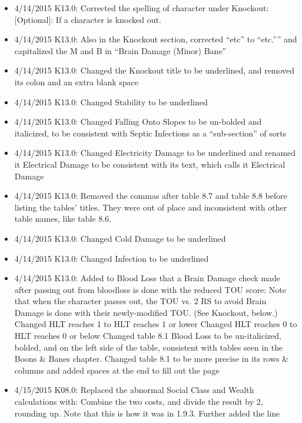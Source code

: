 \documentclass[oneside,11pt,english]{book}
\begin{document}
{\begin{itemize}
Renamed the Head Trauma table to Brain Damage 
Capitalized all instances of “Int” to “INT” under Brain Damage 
Added The result is the effect of the Bane.to the level 2 Brain Damage bane 
 Changed a great amount of the Bane’s wording 
 Altered the Brain Damage table’s results for 4 - 7 
 Wrote an Example for Brain Damage in use 
\item 4/14/2015 K13.0: Corrected the spelling of character under Knockout: [Optional]: If a character is 
knocked out. 
\item 4/14/2015 K13.0: Also in the Knockout section, corrected “etc” to “etc.”” and capitalized the M and B in 
“Brain Damage (Minor) Bane” 
\item 4/14/2015 K13.0: Changed the Knockout title to be underlined, and removed its colon and an extra blank 
space 
\item 4/14/2015 K13.0: Changed Stability to be underlined 
\item 4/14/2015 K13.0: Changed Falling Onto Slopes to be un-bolded and italicized, to be consistent with 
Septic Infections as a “sub-section” of sorts 
\item 4/14/2015 K13.0: Changed Electricity Damage to be underlined and renamed it Electrical Damage to be 
consistent with its text, which calls it Electrical Damage 
\item 4/14/2015 K13.0: Removed the commas after table 8.7 and table 8.8 before listing the tables’ titles. They 
were out of place and inconsistent with other table names, like table 8.6. 
\item 4/14/2015 K13.0: Changed Cold Damage to be underlined 
\item 4/14/2015 K13.0: Changed Infection to be underlined 
\item 4/14/2015 K13.0: Added to Blood Loss that a Brain Damage check made after passing out from bloodloss 
is done with the reduced TOU score: Note that when the character passes out, the TOU vs. 2 RS to avoid 
Brain Damage is done with their newly-modified TOU. (See Knockout, below.) 
Changed HLT reaches 1 to HLT reaches 1 or lower 
Changed HLT reaches 0 to HLT reaches 0 or below 
Changed table 8.1 Blood Loss to be un-italicized, bolded, and on the left side of the table, 
consistent with tables seen in the Boons \& Banes chapter. 
Changed table 8.1 to be more precise in its rows \& columns and added spaces at the end to fill 
out the page 
\item 4/15/2015 K08.0: Replaced the abnormal Social Class and Wealth calculations with: Combine the two 
costs, and divide the result by 2, rounding up. Note that this is how it was in 1.9.3. Further added the line 

\end{itemize}}
\end{document}
